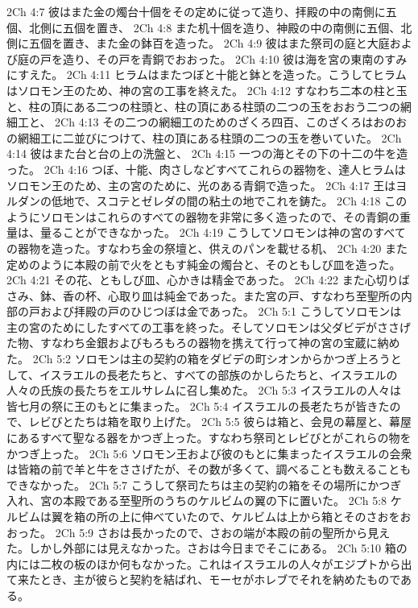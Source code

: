 2Ch 4:7  彼はまた金の燭台十個をその定めに従って造り、拝殿の中の南側に五個、北側に五個を置き、
2Ch 4:8  また机十個を造り、神殿の中の南側に五個、北側に五個を置き、また金の鉢百を造った。
2Ch 4:9  彼はまた祭司の庭と大庭および庭の戸を造り、その戸を青銅でおおった。
2Ch 4:10  彼は海を宮の東南のすみにすえた。
2Ch 4:11  ヒラムはまたつぼと十能と鉢とを造った。こうしてヒラムはソロモン王のため、神の宮の工事を終えた。
2Ch 4:12  すなわち二本の柱と玉と、柱の頂にある二つの柱頭と、柱の頂にある柱頭の二つの玉をおおう二つの網細工と、
2Ch 4:13  その二つの網細工のためのざくろ四百、このざくろはおのおの網細工に二並びにつけて、柱の頂にある柱頭の二つの玉を巻いていた。
2Ch 4:14  彼はまた台と台の上の洗盤と、
2Ch 4:15  一つの海とその下の十二の牛を造った。
2Ch 4:16  つぼ、十能、肉さしなどすべてこれらの器物を、達人ヒラムはソロモン王のため、主の宮のために、光のある青銅で造った。
2Ch 4:17  王はヨルダンの低地で、スコテとゼレダの間の粘土の地でこれを鋳た。
2Ch 4:18  このようにソロモンはこれらのすべての器物を非常に多く造ったので、その青銅の重量は、量ることができなかった。
2Ch 4:19  こうしてソロモンは神の宮のすべての器物を造った。すなわち金の祭壇と、供えのパンを載せる机、
2Ch 4:20  また定めのように本殿の前で火をともす純金の燭台と、そのともしび皿を造った。
2Ch 4:21  その花、ともしび皿、心かきは精金であった。
2Ch 4:22  また心切りばさみ、鉢、香の杯、心取り皿は純金であった。また宮の戸、すなわち至聖所の内部の戸および拝殿の戸のひじつぼは金であった。
2Ch 5:1  こうしてソロモンは主の宮のためにしたすべての工事を終った。そしてソロモンは父ダビデがささげた物、すなわち金銀およびもろもろの器物を携えて行って神の宮の宝蔵に納めた。
2Ch 5:2  ソロモンは主の契約の箱をダビデの町シオンからかつぎ上ろうとして、イスラエルの長老たちと、すべての部族のかしらたちと、イスラエルの人々の氏族の長たちをエルサレムに召し集めた。
2Ch 5:3  イスラエルの人々は皆七月の祭に王のもとに集まった。
2Ch 5:4  イスラエルの長老たちが皆きたので、レビびとたちは箱を取り上げた。
2Ch 5:5  彼らは箱と、会見の幕屋と、幕屋にあるすべて聖なる器をかつぎ上った。すなわち祭司とレビびとがこれらの物をかつぎ上った。
2Ch 5:6  ソロモン王および彼のもとに集まったイスラエルの会衆は皆箱の前で羊と牛をささげたが、その数が多くて、調べることも数えることもできなかった。
2Ch 5:7  こうして祭司たちは主の契約の箱をその場所にかつぎ入れ、宮の本殿である至聖所のうちのケルビムの翼の下に置いた。
2Ch 5:8  ケルビムは翼を箱の所の上に伸べていたので、ケルビムは上から箱とそのさおをおおった。
2Ch 5:9  さおは長かったので、さおの端が本殿の前の聖所から見えた。しかし外部には見えなかった。さおは今日までそこにある。
2Ch 5:10  箱の内には二枚の板のほか何もなかった。これはイスラエルの人々がエジプトから出て来たとき、主が彼らと契約を結ばれ、モーセがホレブでそれを納めたものである。
